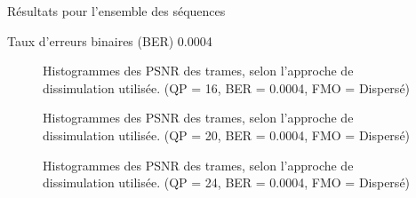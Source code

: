 \begin{section}{Résultats pour l'ensemble des séquences}
\begin{subsection}{Taux d'erreurs binaires (BER) 0.0004}
\begin{figure} 
\caption[]{Histogrammes des PSNR des trames, selon l'approche de dissimulation
utilisée. (QP = 16, BER = 0.0004, FMO = Dispersé)}
\label{fig-HistAllDispersed16x4}
\end{figure}

\begin{figure} 
\caption[]{Histogrammes des PSNR des trames, selon l'approche de dissimulation
utilisée. (QP = 20, BER = 0.0004, FMO = Dispersé)}
\label{fig-HistAllDispersed20x4}
\end{figure}

\begin{figure} 
\caption[]{Histogrammes des PSNR des trames, selon l'approche de dissimulation
utilisée. (QP = 24, BER = 0.0004, FMO = Dispersé)}
\label{fig-HistAllDispersed24x4}
\end{figure}


\end{subsection}
\end{section}
